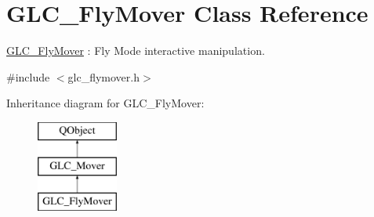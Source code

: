 \hypertarget{class_g_l_c___fly_mover}{\section{G\-L\-C\-\_\-\-Fly\-Mover Class Reference}
\label{class_g_l_c___fly_mover}
}


\hyperlink{class_g_l_c___fly_mover}{G\-L\-C\-\_\-\-Fly\-Mover} \-: Fly Mode interactive manipulation.  




{\ttfamily \#include $<$glc\-\_\-flymover.\-h$>$}

Inheritance diagram for G\-L\-C\-\_\-\-Fly\-Mover\-:\begin{figure}[H]
\begin{center}
\leavevmode
\includegraphics[height=3.000000cm]{class_g_l_c___fly_mover}
\end{center}
\end{figure}
